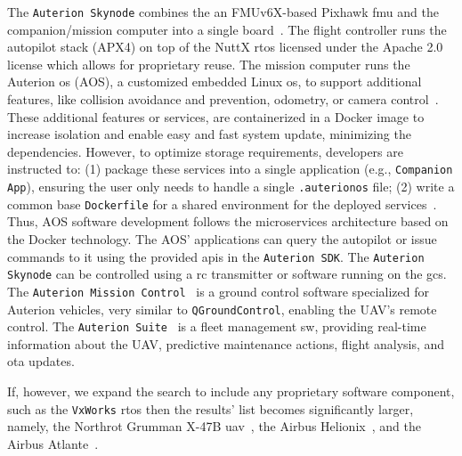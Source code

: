The \lstinline{Auterion Skynode} combines the an FMUv6X-based Pixhawk
\gls{fmu} and the companion/mission computer into a single board~\cite{auterion-sw}. The flight
controller runs the autopilot stack (APX4) on top of the NuttX \gls{rtos}
licensed under the Apache 2.0 license which allows for proprietary reuse. The
mission computer runs the Auterion \gls{os} (AOS), a customized embedded Linux
\gls{os}, to support additional features, like collision avoidance and
prevention, odometry, or camera control~\cite{auterion-sw}. These additional features or services,
are containerized in a Docker image to increase isolation and enable easy and
fast system update, minimizing the dependencies. However, to optimize storage
requirements, developers are instructed to: (1) package these services into a
single application (e.g., \lstinline{Companion App}), ensuring the user only needs to handle a single
\lstinline{.auterionos} file; (2) write a common base \lstinline{Dockerfile} for
a shared environment for the deployed services~\cite{auterion-sw-services}. Thus, AOS software development
follows the microservices architecture based on the Docker technology.
The AOS' applications can query the autopilot or issue commands to it using the
provided \glspl{api} in the \lstinline{Auterion SDK}.
%
The \lstinline{Auterion Skynode} can be controlled using a \gls{rc} transmitter
or software running on the \gls{gcs}. The \lstinline{Auterion Mission Control}~\cite{auterion-missionControl}
is a ground control software specialized for Auterion vehicles, very similar to
\lstinline{QGroundControl}, enabling the UAV's remote control.
The \lstinline{Auterion Suite}~\cite{auterion-suite} is a fleet management \gls{sw}, providing
real-time information about the UAV, predictive maintenance actions, flight
analysis, and \gls{ota} updates.

If, however, we expand the search to include any proprietary
software component, such as the \lstinline{VxWorks} \gls{rtos} then the results'
list becomes significantly larger, namely, the Northrot Grumman X-47B
\gls{uav}~\cite{vxWorks-uav-northrop}, the Airbus
Helionix~\cite{vxWorks-uav-aribus-helionic}, and the Airbus
Atlante~\cite{vxWorks-uav-aribus-atlante}.
%


